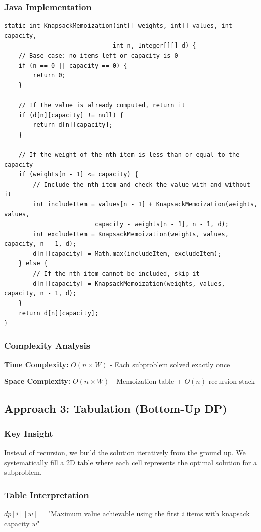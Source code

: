 \documentclass[12pt,a4paper]{article}
\begin{document}
\subsubsection{Java Implementation}
\begin{lstlisting}[caption=Memoization Solution]
static int KnapsackMemoization(int[] weights, int[] values, int capacity, 
                              int n, Integer[][] d) {
    // Base case: no items left or capacity is 0
    if (n == 0 || capacity == 0) {
        return 0;
    }
    
    // If the value is already computed, return it
    if (d[n][capacity] != null) {
        return d[n][capacity];
    }
    
    // If the weight of the nth item is less than or equal to the capacity
    if (weights[n - 1] <= capacity) {
        // Include the nth item and check the value with and without it
        int includeItem = values[n - 1] + KnapsackMemoization(weights, values, 
                         capacity - weights[n - 1], n - 1, d);
        int excludeItem = KnapsackMemoization(weights, values, capacity, n - 1, d);
        d[n][capacity] = Math.max(includeItem, excludeItem);
    } else {
        // If the nth item cannot be included, skip it
        d[n][capacity] = KnapsackMemoization(weights, values, capacity, n - 1, d);
    }
    return d[n][capacity]; 
}
\end{lstlisting}

\subsubsection{Complexity Analysis}
\textbf{Time Complexity:} $O(n \times W)$ - Each subproblem solved exactly once

\textbf{Space Complexity:} $O(n \times W)$ - Memoization table + $O(n)$ recursion stack

\subsection{Approach 3: Tabulation (Bottom-Up DP)}

\subsubsection{Key Insight}
Instead of recursion, we build the solution iteratively from the ground up. We systematically fill a 2D table where each cell represents the optimal solution for a subproblem.

\subsubsection{Table Interpretation}
$dp[i][w]$ = "Maximum value achievable using the first $i$ items with knapsack capacity $w$"
\end{document}
